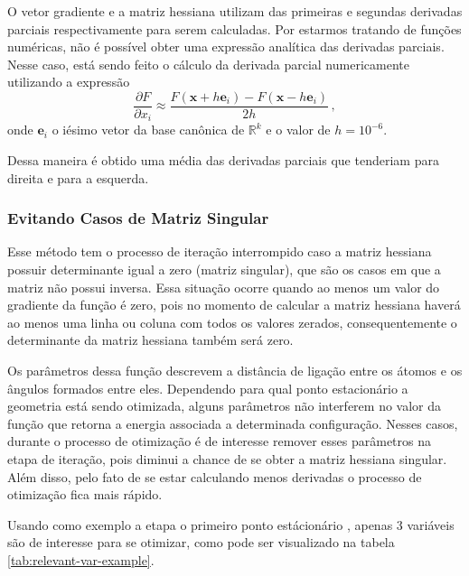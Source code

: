 O vetor gradiente e a matriz hessiana utilizam das primeiras e segundas derivadas parciais respectivamente para serem calculadas. Por estarmos tratando de funções numéricas, não é possível obter uma expressão analítica das derivadas parciais. Nesse caso, está sendo feito o cálculo da derivada parcial numericamente utilizando a expressão
%
\begin{equation}
  \label{eq:partial_derivative}
  \frac{\partial F}{\partial x_i} \approx \frac{F(\mathbf{x}+h \mathbf{e}_i) - F(\mathbf{x}-h \mathbf{e}_i)}{2h} \,,
\end{equation}
%
onde $\mathbf{e}_i$ o iésimo vetor da base canônica de $\mathds{R}^k$ e o valor de $h = 10^{-6}$.

Dessa maneira é obtido uma média das derivadas parciais que tenderiam para direita e para a esquerda.

\subsubsection{Evitando Casos de Matriz Singular}

Esse método tem o processo de iteração interrompido caso a matriz hessiana possuir determinante igual a zero (matriz singular), que são os casos em que a matriz não possui inversa. Essa situação ocorre quando ao menos um valor do gradiente da função é zero, pois no momento de calcular a matriz hessiana haverá ao menos uma linha ou coluna com todos os valores zerados, consequentemente o determinante da matriz hessiana também será zero.

Os parâmetros dessa função descrevem a distância de ligação entre os átomos e os ângulos formados entre eles. Dependendo para qual ponto estacionário a geometria está sendo otimizada, alguns parâmetros não interferem no valor da função que retorna a energia associada a determinada configuração. Nesses casos, durante o processo de otimização é de interesse remover esses parâmetros na etapa de iteração, pois diminui a chance de se obter a matriz hessiana singular. Além disso, pelo fato de se estar calculando menos derivadas o processo de otimização fica mais rápido. 

Usando como exemplo a etapa o primeiro ponto estácionário , apenas 3 variáveis são de interesse para se otimizar, como pode ser visualizado na tabela \ref{tab:relevant-var-example}.

